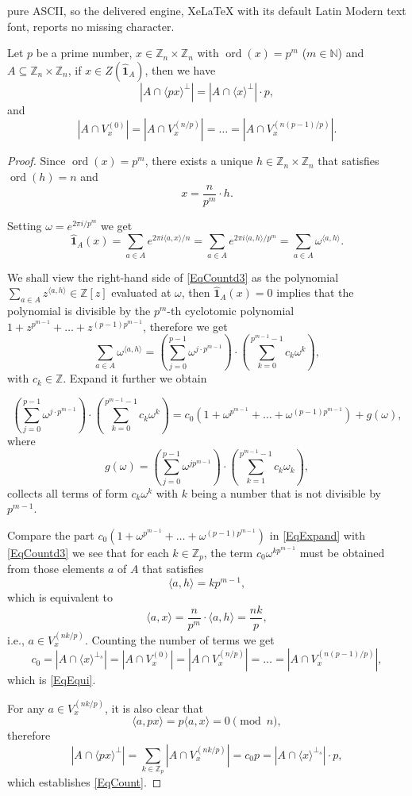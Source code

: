 \documentclass[10pt,a4paper]{amsart}
\DeclareMathOperator{\ord}{ord}
\newcommand{\F}[1]{\widehat{\mathbf 1}_{#1}}
\newcommand{\G}[1]{\mathbb Z_{#1}\times\mathbb Z_{#1}}
\newcommand{\Z}[1]{Z(\F{#1})}
\newcommand{\bra}[1]{\langle#1\rangle}
\begin{document}
pure ASCII, so the delivered engine, XeLaTeX with its default Latin Modern text font, reports no missing character.
\begin{Thm} \label{ThmCount}
Let $p$ be a prime number, $x\in\G{n}$ with $\ord(x)=p^m$ ($m\in\mathbb N$) and $A\subseteq\G{n}$, if $x\in\Z{A}$, then we have
\begin{equation} \label{EqCount}
|A\cap\bra{px}^{\perp}|=|A\cap\bra{x}^{\perp}|\cdot p,
\end{equation}
and
\begin{equation} \label{EqEqui}
|A\cap V_{x}^{(0)}|=|A\cap V_{x}^{(n/p)}|=\ldots=|A\cap V_{x}^{(n(p-1)/p)}|.
\end{equation}
\end{Thm}

\begin{proof}
Since $\ord(x)=p^m$, there exists a unique $h\in\G{n}$ that satisfies $\ord(h)=n$ and 
$$x=\frac{n}{p^m}\cdot h.$$

Setting $\omega=e^{2\pi i/p^m}$ we get
\begin{equation}  \label{EqCountd3}
\F{A}(x)=\sum_{a\in A}e^{2\pi i\bra{a,x}/n}=\sum_{a\in A}e^{2\pi i\bra{a,h}/p^m}=\sum_{a\in A}\omega^{\bra{a,h}}.
\end{equation}

We shall view the right-hand side of \eqref{EqCountd3} as the polynomial $\sum_{a\in A}z^{\bra{a,h}}\in\mathbb Z[z]$ evaluated at $\omega$, then $\F{A}(x)=0$ implies that the polynomial is divisible by the $p^m$-th cyclotomic polynomial $1+z^{p^{m-1}}+\ldots+z^{(p-1)p^{m-1}}$, therefore we get 
$$\sum_{a\in A}\omega^{\bra{a,h}}=\left(\sum_{j=0}^{p-1}\omega^{j\cdot p^{m-1}}\right) \cdot \left(\sum_{k=0}^{p^{m-1}-1}c_k\omega^k\right),$$
with $c_k\in\mathbb Z$. Expand it further we obtain

\begin{equation} \label{EqExpand}
\left(\sum_{j=0}^{p-1}\omega^{j\cdot p^{m-1}}\right) \cdot \left(\sum_{k=0}^{p^{m-1}-1}c_k\omega^k\right)=c_0(1+\omega^{p^{m-1}}+\ldots+\omega^{(p-1)p^{m-1}})+g(\omega),
\end{equation}
where
$$g(\omega)=\left(\sum_{j=0}^{p-1}\omega^{jp^{m-1}}\right) \cdot \left(\sum_{k=1}^{p^{m-1}-1}c_k\omega_k\right),$$
collects all terms of form $c_k\omega^k$ with $k$ being a number that is not divisible by $p^{m-1}$. 

Compare the part $c_0(1+\omega^{p^{m-1}}+\ldots+\omega^{(p-1)p^{m-1}})$ in \eqref{EqExpand} with \eqref{EqCountd3} we see that for each $k\in\mathbb Z_p$, the term $ c_0\omega^{kp^{m-1}}$ must be obtained from those elements $a$ of $A$ that satisfies
$$\bra{a,h}=kp^{m-1},$$
which is equivalent to
$$\bra{a,x}=\frac{n}{p^m}\cdot\bra{a,h}=\frac{nk}{p},$$
i.e., $a\in V_x^{(nk/p)}$. 
Counting the number of terms we get 
$$c_0=|A\cap\bra{x}^{\perp_s}|=|A\cap V_{x}^{(0)}|=|A\cap V_{x}^{(n/p)}|=\ldots=|A\cap V_{x}^{(n(p-1)/p)}|,$$
which is \eqref{EqEqui}. 

For any $a\in V_x^{(nk/p)}$, it is also clear that 
$$\bra{a,px}=p\bra{a,x}=0\pmod n,$$
therefore
$$|A\cap\bra{px}^{\perp}|=\sum_{k\in\mathbb Z_p}|A\cap V_{x}^{(nk/p)}|=c_0p=|A\cap\bra{x}^{\perp_s}|\cdot p,$$
which establishes \eqref{EqCount}. 
\end{proof}
\end{document}
